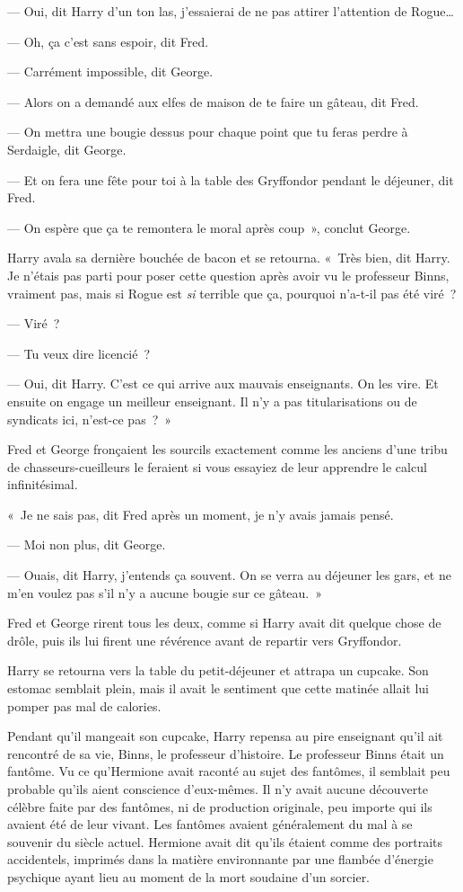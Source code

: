 --- Oui, dit Harry d'un ton las, j'essaierai de ne pas attirer l'attention de Rogue…

--- Oh, ça c'est sans espoir, dit Fred.

--- Carrément impossible, dit George.

--- Alors on a demandé aux elfes de maison de te faire un gâteau, dit Fred.

--- On mettra une bougie dessus pour chaque point que tu feras perdre à Serdaigle, dit George.

--- Et on fera une fête pour toi à la table des Gryffondor pendant le déjeuner, dit Fred.

--- On espère que ça te remontera le moral après coup~», conclut George.

Harry avala sa dernière bouchée de bacon et se retourna.
«~Très bien, dit Harry.
Je n'étais pas parti pour poser cette question après avoir vu le professeur Binns, vraiment pas, mais si Rogue est \emph{si} terrible que ça, pourquoi n'a-t-il pas été viré~?

--- Viré~?

--- Tu veux dire licencié~?

--- Oui, dit Harry.
C'est ce qui arrive aux mauvais enseignants.
On les vire.
Et ensuite on engage un meilleur enseignant.
Il n'y a pas titularisations ou de syndicats ici, n'est-ce pas~?~»

Fred et George fronçaient les sourcils exactement comme les anciens d'une tribu de chasseurs-cueilleurs le feraient si vous essayiez de leur apprendre le calcul infinitésimal.

«~Je ne sais pas, dit Fred après un moment, je n'y avais jamais pensé.

--- Moi non plus, dit George.

--- Ouais, dit Harry, j'entends ça souvent.
On se verra au déjeuner les gars, et ne m'en voulez pas s'il n'y a aucune bougie sur ce gâteau.~»

Fred et George rirent tous les deux, comme si Harry avait dit quelque chose de drôle, puis ils lui firent une révérence avant de repartir vers Gryffondor.

Harry se retourna vers la table du petit-déjeuner et attrapa un cupcake.
Son estomac semblait plein, mais il avait le sentiment que cette matinée allait lui pomper pas mal de calories.

Pendant qu'il mangeait son cupcake, Harry repensa au pire enseignant qu'il ait rencontré de sa vie, Binns, le professeur d'histoire.
Le professeur Binns était un fantôme.
Vu ce qu'Hermione avait raconté au sujet des fantômes, il semblait peu probable qu'ils aient conscience d'eux-mêmes.
Il n'y avait aucune découverte célèbre faite par des fantômes, ni de production originale, peu importe qui ils avaient été de leur vivant.
Les fantômes avaient généralement du mal à se souvenir du siècle actuel.
Hermione avait dit qu'ils étaient comme des portraits accidentels, imprimés dans la matière environnante par une flambée d'énergie psychique ayant lieu au moment de la mort soudaine d'un sorcier.

